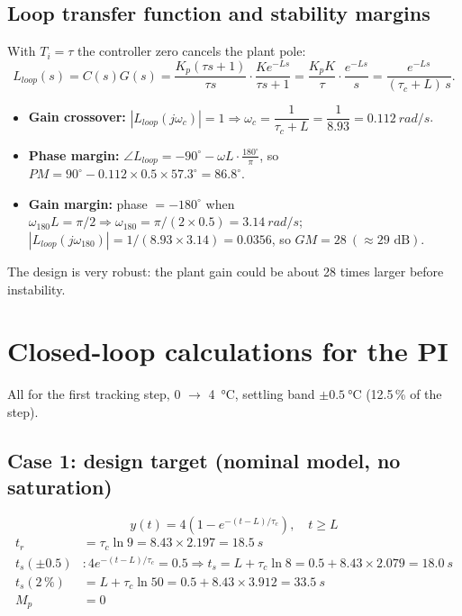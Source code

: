 \documentclass[11pt,a4paper]{article}
\begin{document}
\subsection{Loop transfer function and stability margins}
With $T_i = \tau$ the controller zero cancels the plant pole:
\[
L_{loop}(s) = C(s)G(s) = \frac{K_p(\tau s+1)}{\tau s}\cdot\frac{K e^{-Ls}}{\tau s + 1}
= \frac{K_p K}{\tau}\cdot\frac{e^{-Ls}}{s} = \frac{e^{-Ls}}{(\tau_c + L)\,s}.
\]
\begin{itemize}
\item \textbf{Gain crossover:} $|L_{loop}(j\omega_c)| = 1 \Rightarrow \omega_c = \dfrac{1}{\tau_c + L} = \dfrac{1}{8.93} = \SI{0.112}{rad\per s}$.
\item \textbf{Phase margin:} $\angle L_{loop} = -90^\circ - \omega L\cdot\frac{180^\circ}{\pi}$, so
$PM = 90^\circ - 0.112\times0.5\times57.3^\circ = \boxed{86.8^\circ}$.
\item \textbf{Gain margin:} phase $= -180^\circ$ when $\omega_{180} L = \pi/2 \Rightarrow \omega_{180} = \pi/(2\times0.5) = \SI{3.14}{rad\per s}$;
$|L_{loop}(j\omega_{180})| = 1/(8.93\times3.14) = 0.0356$, so $GM = \boxed{28\ (\approx 29\text{ dB})}$.
\end{itemize}
The design is very robust: the plant gain could be about 28 times larger before instability.

\section{Closed-loop calculations for the PI}
All for the first tracking step, 0 $\to$ \SI{+4}{\celsius}, settling band $\pm\SI{0.5}{\celsius}$ (12.5\,\% of the step).

\subsection{Case 1: design target (nominal model, no saturation)}
\[
y(t) = 4\left(1 - e^{-(t-L)/\tau_c}\right),\quad t \ge L
\]
\begin{align*}
t_r &= \tau_c \ln 9 = 8.43\times2.197 = \boxed{\SI{18.5}{s}}\\
t_s(\pm0.5) &: 4e^{-(t-L)/\tau_c} = 0.5 \Rightarrow t_s = L + \tau_c\ln 8 = 0.5 + 8.43\times2.079 = \boxed{\SI{18.0}{s}}\\
t_s(2\,\%) &= L + \tau_c\ln 50 = 0.5 + 8.43\times3.912 = \SI{33.5}{s}\\
M_p &= 0
\end{align*}
\end{document}
